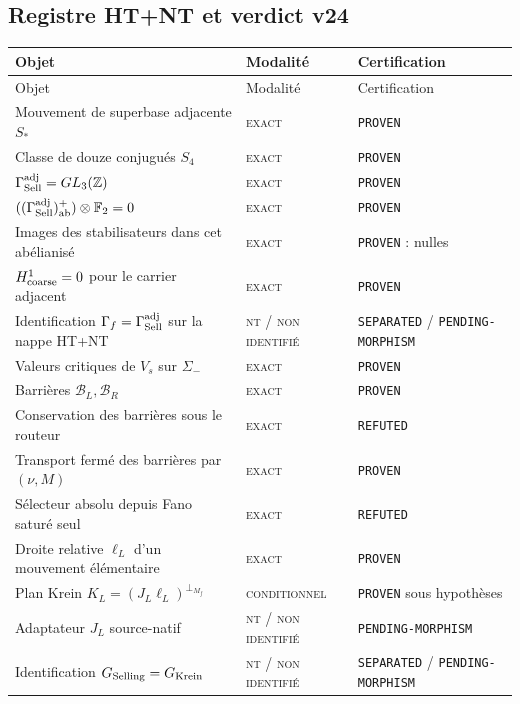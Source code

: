 \documentclass[11pt,a4paper]{article}
\newcommand{\statusExact}{\textsc{exact}}
\newcommand{\statusCond}{\textsc{conditionnel}}
\newcommand{\statusNT}{\textsc{nt / non identifié}}
\newcommand{\certProven}{\texttt{PROVEN}}
\newcommand{\certRefuted}{\texttt{REFUTED}}
\newcommand{\certSeparated}{\texttt{SEPARATED}}
\newcommand{\certPending}{\texttt{PENDING-MORPHISM}}
\begin{document}
\subsection{Registre HT+NT et verdict v24}

\begin{longtable}{p{}p{}p{}}
\toprule
Objet & Modalité & Certification \\
\midrule
\endfirsthead
\toprule
Objet & Modalité & Certification \\
\midrule
\endhead
Mouvement de superbase adjacente $S_*$ & \statusExact & \certProven \\
Classe de douze conjugués $S_4$ & \statusExact & \certProven \\
$\Gamma_{\rm Sell}^{\rm adj}=GL_3(\mathbb Z)$ & \statusExact & \certProven \\
$((\Gamma_{\rm Sell}^{\rm adj})^+_{\rm ab})\otimes\mathbb F_2=0$ & \statusExact & \certProven \\
Images des stabilisateurs dans cet abélianisé & \statusExact & \certProven{} : nulles \\
$H^1_{\rm coarse}=0$ pour le carrier adjacent & \statusExact & \certProven \\
Identification $\Gamma_f=\Gamma_{\rm Sell}^{\rm adj}$ sur la nappe HT+NT & \statusNT & \certSeparated{} / \certPending \\
Valeurs critiques de $V_s$ sur $\Sigma_-$ & \statusExact & \certProven \\
Barrières $\mathcal B_L,\mathcal B_R$ & \statusExact & \certProven \\
Conservation des barrières sous le routeur & \statusExact & \certRefuted \\
Transport fermé des barrières par $(\nu,M)$ & \statusExact & \certProven \\
Sélecteur absolu depuis Fano saturé seul & \statusExact & \certRefuted \\
Droite relative $\ell_L$ d'un mouvement élémentaire & \statusExact & \certProven \\
Plan Krein $K_L=(J_L\ell_L)^{\perp_{M_f}}$ & \statusCond & \certProven{} sous hypothèses \\
Adaptateur $J_L$ source-natif & \statusNT & \certPending \\
Identification $G_{\rm Selling}=G_{\rm Krein}$ & \statusNT & \certSeparated{} / \certPending \\
\bottomrule
\end{longtable}
\end{document}
